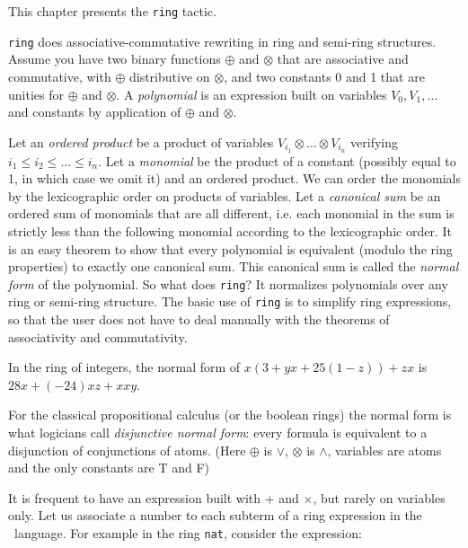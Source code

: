 \label{ring}

This chapter presents  the \texttt{ring} tactic.


\texttt{ring} does associative-commutative rewriting in ring and semi-ring
structures. Assume you have two binary functions $\oplus$ and $\otimes$
that are associative and commutative, with $\oplus$ distributive on
$\otimes$, and two constants 0 and 1 that are unities for $\oplus$ and
$\otimes$. A \textit{polynomial} is an expression built on variables $V_0, V_1,
\dots$ and constants by application of $\oplus$ and $\otimes$.

Let an {\it ordered product} be a product of variables $V_{i_1} \otimes
\ldots \otimes V_{i_n}$ verifying $i_1 \le i_2 \le \dots \le i_n$. Let a
\textit{monomial} be the product of a constant (possibly equal to 1, in
which case we omit it) and an ordered product.  We can order the
monomials by the lexicographic order on products of variables. Let a
\textit{canonical sum} be an ordered sum of monomials that are all
different, i.e. each monomial in the sum is strictly less than the
following monomial according to the lexicographic order. It is an easy
theorem to show that every polynomial is equivalent (modulo the ring
properties) to exactly one canonical sum. This canonical sum is called
the \textit{normal form} of the polynomial. So what does \texttt{ring}? It
normalizes polynomials over any ring or semi-ring structure. The basic
use of \texttt{ring} is to simplify ring expressions, so that the user
does not have to deal manually with the theorems of associativity and
commutativity.

\begin{Examples}
\item In the ring of integers, the normal form of 
$x (3 + yx + 25(1 - z)) + zx$ is $28x + (-24)xz + xxy$.
\item For the classical propositional calculus (or the boolean rings)
  the normal form is what logicians call \textit{disjunctive normal
    form}: every formula is equivalent to a disjunction of
  conjunctions of atoms. (Here $\oplus$ is $\vee$, $\otimes$ is
  $\wedge$, variables are atoms and the only constants are T and F)
\end{Examples}


It is frequent to have an expression built with + and
  $\times$, but rarely on variables only.
Let us associate a number to each subterm of a ring
expression in the \gallina\ language. For example in the ring
\texttt{nat}, consider the expression:

